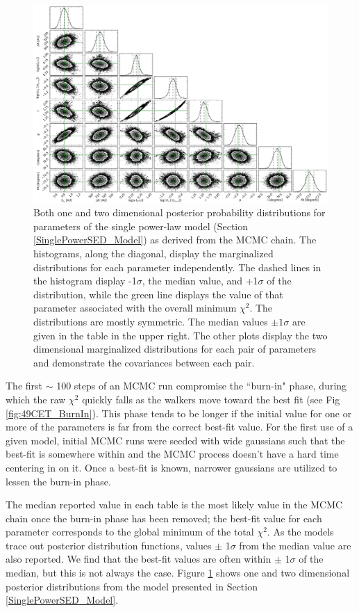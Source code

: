 {{\begin{figure}
\centering
\includegraphics[width = 1\textwidth]{49CET_140x1000_Triangle_150StepBurnIn.png}
\caption{Both one and two dimensional posterior probability distributions for parameters of the single power-law model (Section \ref{SinglePowerSED_Model}) as derived from the MCMC chain. The histograms, along the diagonal, display the marginalized distributions for each parameter independently. The dashed lines in the histogram display -1$\sigma$, the median value, and +1$\sigma$ of the distribution, while the green line displays the value of that parameter associated with the overall minimum $\chi^{2}$. The distributions are mostly symmetric. The median values $\pm1\sigma$ are given in the table in the upper right. The other plots display the two dimensional marginalized distributions for each pair of parameters and demonstrate the covariances between each pair.}
\label{fig:49CET_Triangle}
\end{figure}

The first $\sim$ 100 steps of an MCMC run compromise the ``burn-in" phase, during which the raw $\chi^{2}$ quickly falls as the walkers move toward the best fit (see Fig \ref{fig:49CET_BurnIn}). This phase tends to be longer if the initial value for one or more of the parameters is far from the correct best-fit value. For the first use of a given model, initial MCMC runs were seeded with wide gaussians such that the best-fit is somewhere within and the MCMC process doesn't have a hard time centering in on it. Once a best-fit is known, narrower gaussians are utilized to lessen the burn-in phase. 

The median reported value in each table is the most likely value in the MCMC chain once the burn-in phase has been removed; the best-fit value for each parameter corresponds to the global minimum of the total $\chi^{2}$. As the models trace out posterior distribution functions, values $\pm$ 1$\sigma$ from the median value are also reported. We find that the best-fit values are often within $\pm$ 1$\sigma$ of the median, but this is not always the case. Figure \ref{fig:49CET_Triangle} shows one and two dimensional posterior distributions from the model presented in Section \ref{SinglePowerSED_Model}.

}}
